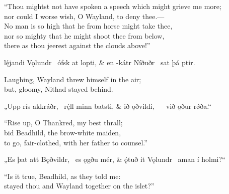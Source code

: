 \bvb{}%
“Thou mightst not have spoken a speech which might grieve me more; \\
nor could I worse wish, O Wayland, to deny thee.— \\
No man is so high that he from horse might take thee, \\
nor so mighty that he might shoot thee from below, \\
there as thou jeerest against the clouds above!”\evb\evg


\bvg\bva{}lę́jandi Vǫlundr \hld\ ófsk at lopti, &
en -kátr Níðuðr \hld\ sat þá ptir.\eva

\bvb Laughing, Wayland threw himself in the air; \\
but, gloomy, Nithad stayed behind.\evb\evg

\sectionline

\bvg\bva{}%
„Upp rís akkráðr, \hld\ rę́ll minn batsti, &
ið ǫðvildi, \hld\  \hld\ við ǫður rǿða.“\eva

\bvb{}%
“Rise up, O Thankred, my best thrall; \\
bid Beadhild, the brow-white maiden, \\
to go, fair-clothed, with her father to counsel.”\evb\evg

\sectionline

\bvg\bva{}%
„Es þat att Bǫðvildr, \hld\ es ǫgðu mér, &
ǫ́tuð it Vǫlundr \hld\ aman í holmi?“\eva

\bvb{}%
“Is it true, Beadhild, as they told me: \\
stayed thou and Wayland together on the islet?”\evb\evg


